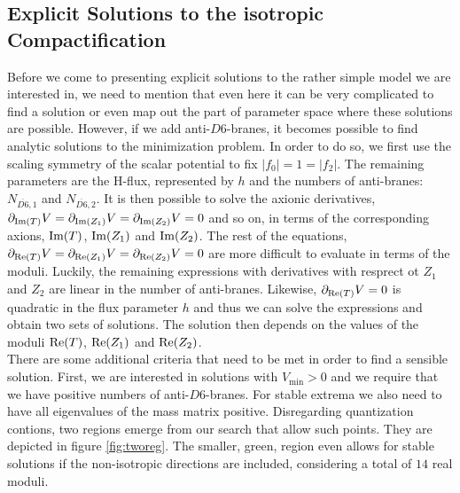 \documentclass[a4paper,12pt]{report}
\def\rmre{{\rm Re}}
\def\rmim{{\rm Im}}
\begin{document}
\subsection{Explicit Solutions to the isotropic Compactification}
Before we come to presenting explicit solutions to the rather simple model we are interested in, we need to mention that even here it can be very complicated to find a solution or even map out the part of parameter space where these solutions are possible. However, if we add anti-$D6$-branes, it becomes possible to find analytic solutions to the minimization problem. In order to do so, we first use the scaling symmetry of the scalar potential to fix $|f_0| = 1 = |f_2|$. The remaining parameters are the H-flux, represented by $h$ and the numbers of anti-branes: $N_{\overline{D6},1}$ and $N_{\overline{D6},2}$. It is then possible to solve the axionic derivatives, $\partial_{\rmim(T)} V = \partial_{\rmim(Z_1)} V = \partial_{\rmim(Z_2)} V= 0$ and so on, in terms of the corresponding axions, $\rmim(T)$, $\rmim(Z_1)$ and $\rmim(Z_2)$. The rest of the equations, $\partial_{\rmre(T)} V = \partial_{\rmre(Z_1)} V = \partial_{\rmre(Z_2)} V=0$ are more difficult to evaluate in terms of the moduli. Luckily, the remaining expressions with derivatives with resprect ot $Z_1$ and $Z_2$ are linear in the number of anti-branes. Likewise, $\partial_{\rmre(T)} V = 0$ is quadratic in the flux parameter $h$ and thus we can solve the expressions and obtain two sets of solutions. The solution then depends on the values of the moduli $\rmre(T)$, $\rmre(Z_1)$ and $\rmre(Z_2)$.\\
There are some additional criteria that need to be met in order to find a sensible solution. First, we are interested in solutions with $V_{\text{min}} >0$ and we require that we have positive numbers of anti-$D6$-branes. For stable extrema we also need to have all eigenvalues of the mass matrix positive. Disregarding quantization contions, two regions emerge from our search that allow such points. They are depicted in figure \ref{fig:tworeg}. The smaller, green, region even allows for stable solutions if the non-isotropic directions are included, considering a total of $14$ real moduli.
\end{document}
